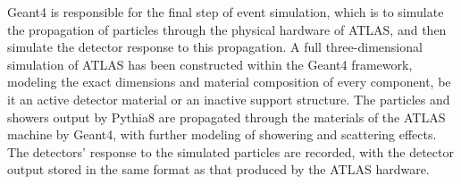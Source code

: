 
    Geant4 is responsible for the final step of event simulation,
        which is to simulate the propagation of particles through the physical hardware of ATLAS,
        and then simulate the detector response to this propagation.
    A full three-dimensional simulation of ATLAS has been constructed within the Geant4 framework,
        modeling the exact dimensions and material composition of every component,
        be it an active detector material or an inactive support structure.
    The particles and showers output by Pythia8 are propagated through the materials of the ATLAS machine by Geant4,
        with further modeling of showering and scattering effects.
    The detectors' response to the simulated particles are recorded, with the detector output stored in the same format as that produced by the ATLAS hardware.

